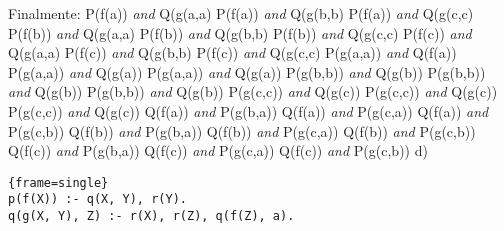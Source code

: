 \documentclass[12pt,a4paper,spanish]{article}
\begin{document}
\begin{enumerate}
   \newline
  Finalmente:
  \newline
  \newline
  P(f(a)) \emph{and} Q(g(a,a)
  \newline
P(f(a)) \emph{and} Q(g(b,b)
\newline
P(f(a)) \emph{and} Q(g(c,c)
\newline
P(f(b)) \emph{and} Q(g(a,a)
\newline
P(f(b)) \emph{and} Q(g(b,b)
\newline
P(f(b)) \emph{and} Q(g(c,c)
\newline
P(f(c)) \emph{and} Q(g(a,a)
\newline
P(f(c)) \emph{and} Q(g(b,b)
\newline
P(f(c)) \emph{and} Q(g(c,c)
\newline
P(g(a,a)) \emph{and} Q(f(a))
\newline
P(g(a,a)) \emph{and} Q(g(a))
\newline
P(g(a,a)) \emph{and} Q(g(a))
\newline
P(g(b,b)) \emph{and} Q(g(b))
\newline
P(g(b,b)) \emph{and} Q(g(b))
\newline
P(g(b,b)) \emph{and} Q(g(b))
\newline
P(g(c,c)) \emph{and} Q(g(c))
\newline
P(g(c,c)) \emph{and} Q(g(c))
\newline
P(g(c,c)) \emph{and} Q(g(c))
\newline
   Q(f(a)) \emph{and} P(g(b,a))
   \newline
   Q(f(a)) \emph{and} P(g(c,a))
   \newline
   Q(f(a)) \emph{and} P(g(c,b))
   \newline
   Q(f(b)) \emph{and} P(g(b,a))
   \newline
   Q(f(b)) \emph{and} P(g(c,a))
   \newline
   Q(f(b)) \emph{and} P(g(c,b))
   \newline
   Q(f(c)) \emph{and} P(g(b,a))
   \newline
   Q(f(c)) \emph{and} P(g(c,a))
   \newline
   Q(f(c)) \emph{and} P(g(c,b))
   \newline
   \newline
d)
\newline
\lstset{language=prolog, breaklines=True, basicstyle=\footnotesize}
\begin{lstlisting}{frame=single}
p(f(X)) :- q(X, Y), r(Y).
q(g(X, Y), Z) :- r(X), r(Z), q(f(Z), a).

\end{lstlisting}
\end{enumerate}
\end{document}
